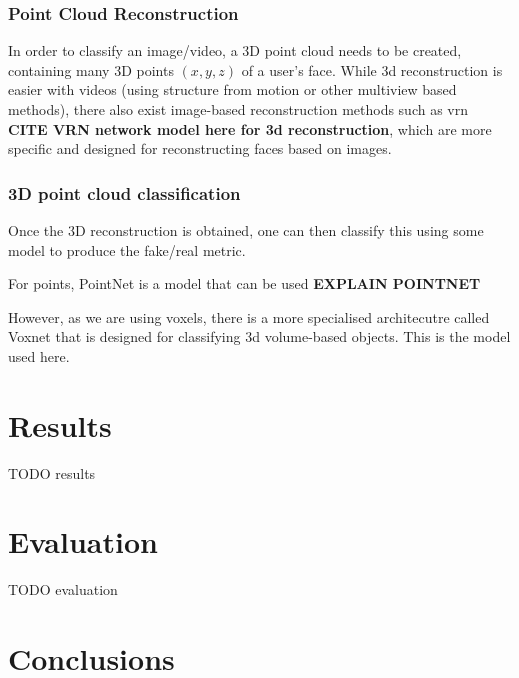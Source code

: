 \documentclass[10pt,a4paper]{article}
\begin{document}
        \subsubsection{Point Cloud Reconstruction}
            In order to classify an image/video, a 3D point cloud needs to be created, containing many 3D points $(x,y,z)$
            of a user's face. While 3d reconstruction is easier with videos (using structure from motion or other multiview based methods),
            there also exist image-based reconstruction methods such as vrn \textbf{CITE VRN network model here for 3d reconstruction}, which are
            more specific and designed for reconstructing faces based on images.

        \subsubsection{3D point cloud classification}
            Once the 3D reconstruction is obtained, one can then classify this using some model to produce the fake/real metric.

            For points, PointNet is a model that can be used \textbf{EXPLAIN POINTNET}

            However, as we are using voxels, there is a more specialised architecutre called Voxnet that is designed for classifying
            3d volume-based objects. This is the model used here.
\section{Results}
    TODO results
\section{Evaluation}
    TODO evaluation


\section{Conclusions}




\end{document}
